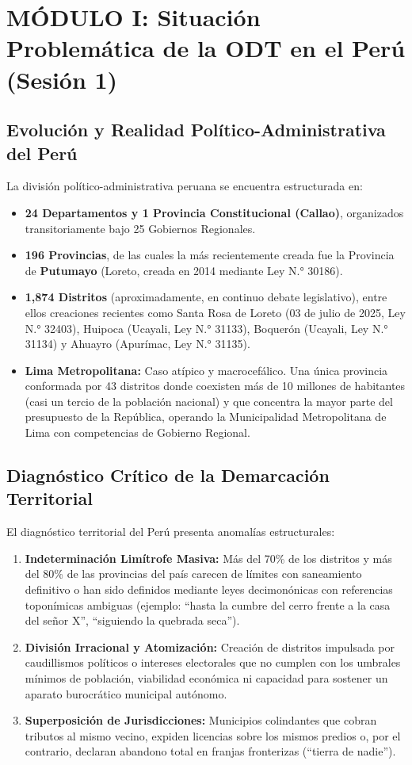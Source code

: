 \documentclass[11pt,a4paper]{article}
\begin{document}
\newpage
\section{MÓDULO I: Situación Problemática de la ODT en el Perú (Sesión 1)}

\subsection{Evolución y Realidad Político-Administrativa del Perú}
La división político-administrativa peruana se encuentra estructurada en:
\begin{itemize}
    \item \textbf{24 Departamentos y 1 Provincia Constitucional (Callao)}, organizados transitoriamente bajo 25 Gobiernos Regionales.
    \item \textbf{196 Provincias}, de las cuales la más recientemente creada fue la Provincia de \textbf{Putumayo} (Loreto, creada en 2014 mediante Ley N.° 30186).
    \item \textbf{1,874 Distritos} (aproximadamente, en continuo debate legislativo), entre ellos creaciones recientes como Santa Rosa de Loreto (03 de julio de 2025, Ley N.° 32403), Huipoca (Ucayali, Ley N.° 31133), Boquerón (Ucayali, Ley N.° 31134) y Ahuayro (Apurímac, Ley N.° 31135).
    \item \textbf{Lima Metropolitana:} Caso atípico y macrocefálico. Una única provincia conformada por 43 distritos donde coexisten más de 10 millones de habitantes (casi un tercio de la población nacional) y que concentra la mayor parte del presupuesto de la República, operando la Municipalidad Metropolitana de Lima con competencias de Gobierno Regional.
\end{itemize}

\subsection{Diagnóstico Crítico de la Demarcación Territorial}
El diagnóstico territorial del Perú presenta anomalías estructurales:
\begin{enumerate}
    \item \textbf{Indeterminación Limítrofe Masiva:} Más del 70\% de los distritos y más del 80\% de las provincias del país carecen de límites con saneamiento definitivo o han sido definidos mediante leyes decimonónicas con referencias toponímicas ambiguas (ejemplo: ``hasta la cumbre del cerro frente a la casa del señor X'', ``siguiendo la quebrada seca'').
    \item \textbf{División Irracional y Atomización:} Creación de distritos impulsada por caudillismos políticos o intereses electorales que no cumplen con los umbrales mínimos de población, viabilidad económica ni capacidad para sostener un aparato burocrático municipal autónomo.
    \item \textbf{Superposición de Jurisdicciones:} Municipios colindantes que cobran tributos al mismo vecino, expiden licencias sobre los mismos predios o, por el contrario, declaran abandono total en franjas fronterizas (``tierra de nadie'').
\end{enumerate}
\end{document}
